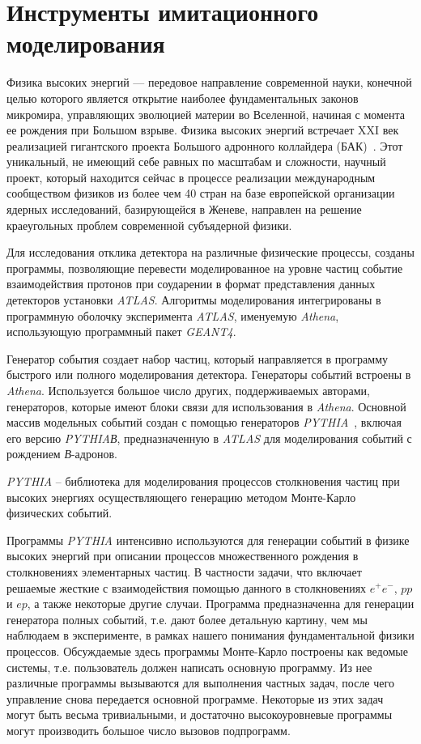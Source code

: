 \section{Инструменты имитационного моделирования}

Физика высоких энергий — передовое направление современной науки, конечной целью которого является открытие наиболее фундаментальных законов микромира, управляющих эволюцией материи во Вселенной, начиная с момента ее рождения при Большом взрыве. Физика высоких энергий встречает XXI век реализацией гигантского проекта Большого адронного коллайдера (БАК)~\cite{2part-1}. Этот уникальный, не имеющий себе равных по масштабам и сложности, научный проект, который находится сейчас в процессе реализации международным сообществом физиков из более чем 40 стран на базе европейской организации ядерных исследований, базирующейся в Женеве, направлен на решение краеугольных проблем современной субъядерной физики.

Для исследования отклика детектора на различные физические процессы, созданы программы, позволяющие перевести моделированное на уровне частиц событие  взаимодействия протонов при соударении в формат представления данных детекторов установки \textit{ATLAS}. Алгоритмы моделирования интегрированы в программную оболочку эксперимента  \textit{ATLAS}, именуемую \textit{Athena}, использующую программный пакет \textit{GEANT4}.

Генератор события создает набор частиц, который направляется в программу быстрого или полного моделирования детектора. Генераторы событий встроены в \textit{Athena}. Используется большое число других, поддерживаемых авторами, генераторов, которые имеют блоки связи для использования в \textit{Athena}. Основной массив модельных событий создан с помощью генераторов \textit{PYTHIA}~\cite{2part-pythia-all}, включая его версию \textit{PYTHIAВ},  предназначенную в  \textit{ATLAS} для моделирования событий с рождением \textit{В}-адронов.

\textit{PYTHIA} -- библиотека для моделирования процессов столкновения частиц при высоких энергиях осуществляющего генерацию методом Монте-Карло физических событий.

Программы \textit{PYTHIA} интенсивно используются для генерации событий в физике высоких энергий при описании процессов множественного рождения в столкновениях элементарных частиц. В частности задачи, что включает решаемые жесткие с взаимодействия помощью данного в столкновениях $e^+e^-$, $pp$ и $ep$, а также некоторые другие случаи. Программа предназначенна для генерации генератора полных событий, т.е. дают более детальную картину, чем мы наблюдаем в эксперименте, в рамках нашего понимания фундаментальной физики процессов. Обсуждаемые здесь программы Монте-Карло построены как ведомые системы, т.е. пользователь должен написать основную программу. Из нее различные программы вызываются для выполнения частных задач, после чего управление снова передается основной программе. Некоторые из этих задач могут быть весьма тривиальными, и достаточно высокоуровневые программы могут производить большое число вызовов подпрограмм.

